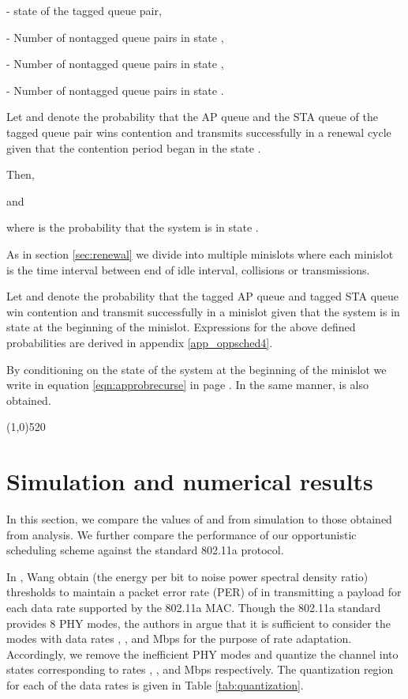 \documentclass[10pt,conference]{IEEEtran}
\begin{document}
	 - state of the tagged queue pair,
	
	 - Number of nontagged queue pairs in state ,
	
	 - Number of nontagged queue pairs in state ,
	
	 - Number of nontagged queue pairs in state .
	
Let  and  denote the probability that the AP queue and the STA queue of the tagged queue pair wins contention and transmits successfully in a renewal cycle given that the contention period began in the state .

Then,
	
	
	and
	
	
where  is the probability that the system is in state .

As in section \ref{sec:renewal} we divide into multiple minislots where each minislot is the time interval between end of idle interval, collisions or transmissions.
 
 Let  and  denote the probability that the tagged AP queue and tagged STA queue win contention and transmit successfully in a minislot given that the system is in state  at the beginning of the minislot.
Expressions for the above defined probabilities are derived in appendix \ref{app_oppsched4}.

 By conditioning on the state of the system at the beginning of the minislot we write in equation \ref{eqn:approbrecurse} in page \pageref{eqn:approbrecurse}.
 In the same manner,  is also obtained.
\begin{figure*}


\line(1,0){520}
\end{figure*}
 
\section{Simulation and numerical results}
\label{sec:oppsimln}
In this section, we compare the values of   and  from simulation to those obtained from analysis.
 We further compare the performance of our opportunistic scheduling scheme against the standard 802.11a protocol.

In \cite{wang2009joint}, Wang obtain  (the energy per bit to noise power spectral density ratio) thresholds to maintain a packet error rate (PER) of  in transmitting a  payload for each data rate supported by the 802.11a MAC. 
Though the 802.11a standard provides 8 PHY modes, the authors in \cite{wang2009joint} argue that it is sufficient to consider the modes with data rates , ,  and  Mbps for the purpose of rate adaptation.  
Accordingly, we remove the inefficient PHY modes and quantize the channel into  states corresponding to rates , ,  and  Mbps respectively.
The quantization region for each of the data rates is given in Table \ref{tab:quantization}.
\end{document}
